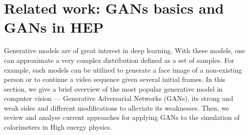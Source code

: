 

\section{Related work: GANs basics and GANs in HEP}
Generative models are of great interest in deep learning. With these models, one can approximate a very complex distribution defined as a set of samples. 
For example, such models can be utilized to generate a face image of a non-existing person or to continue a video sequence given several initial frames. 
In this section, we give a brief overview of the most popular generative model in computer vision — Generative Adversarial Networks (GANs),
 its strong and weak sides and different modifications to alleviate its weaknesses. Then, we review and analyse current approaches for applying GANs to the simulation of calorimeters in High energy physics.

